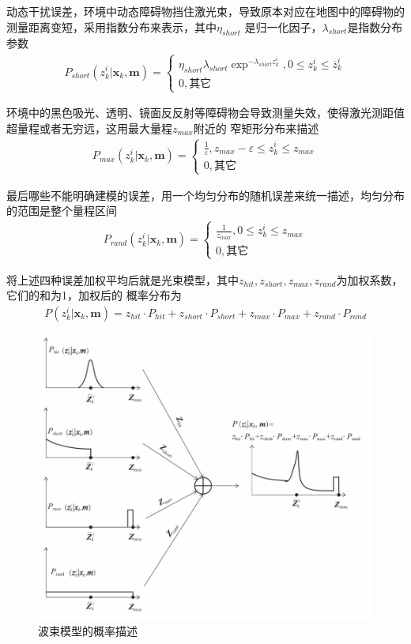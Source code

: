 \documentclass[10pt]{article}
\begin{document}
动态干扰误差，环境中动态障碍物挡住激光束，导致原本对应在地图中的障碍物的测量距离变短，采用指数分布来表示，其中$\eta_{short}$
是归一化因子，$\lambda_{short}$是指数分布参数
\begin{align} 
    P_{short}(z_{k}^{i} | \mathbf{x}_k, \mathbf{m}) = \left\{\begin{array}{l}\eta_{short}\lambda_{short}
    \exp^{-\lambda_{short}z_{k}^{i}},0\leq z_{k}^{i}\leq \overline{z}_{k}^{i} \\ 0,\text{其它}\end{array}
    \right. 
\end{align}

环境中的黑色吸光、透明、镜面反反射等障碍物会导致测量失效，使得激光测距值超量程或者无穷远，这用最大量程$z_{max}$附近的
窄矩形分布来描述
\begin{align}  
    P_{max}(z_{k}^{i} | \mathbf{x}_k,\mathbf{m})=\left\{\begin{array}{l}\frac{1}{\varepsilon},z_{max}
    -\varepsilon \leq z_{k}^{i} \leq z_{max} \\ 0,\text{其它} \end{array}\right.
\end{align}

最后哪些不能明确建模的误差，用一个均匀分布的随机误差来统一描述，均匀分布的范围是整个量程区间
\begin{align} 
    P_{rand}(z_{k}^{i} | \mathbf{x}_{k},\mathbf{m})=\left\{\begin{array}{l}\frac{1}{z_{max}},0\leq 
    z_{k}^{i} \leq z_{max} \\ 0,\text{其它}\end{array}\right.
\end{align}

将上述四种误差加权平均后就是光束模型，其中$z_{hit},z_{short},z_{max},z_{rand}$为加权系数，它们的和为1，加权后的
概率分布为
\begin{align} 
    P(z_{k}^{i} | \mathbf{x}_{k},\mathbf{m}) = z_{hit}\cdot P_{hit}+z_{short}\cdot P_{short}+
    z_{max}\cdot P_{max}+z_{rand}\cdot P_{rand}
\end{align}
\begin{figure}[!htb]
    \includegraphics[width=\hsize]{images/波束模型的概率描述.png}
    \caption{波束模型的概率描述}
\end{figure}
\end{document}
